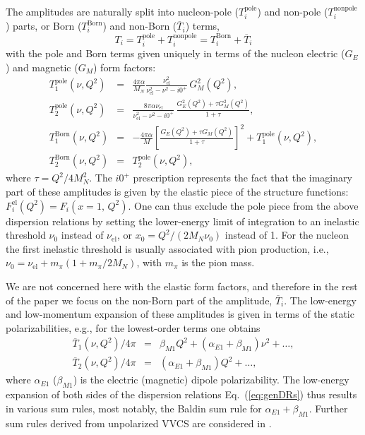 \documentclass[12pt,preprint,tightenlines,
showpacs,preprintnumbers,amsmath,amssymb,
a4paper,nofootinbib]{revtex4-1}
\def\beq{\begin{equation}}
\def\eeq{\end{equation}}
\def\bea{\begin{eqnarray}}
\def\eea{\end{eqnarray}}
\def\Eqref#1{Eq.~(\ref{eq:#1})}
\def\al{\alpha}
\def\nn{\nonumber}
\def\ol#1{\overline{#1}}
\begin{document}
The amplitudes are naturally split into nucleon-pole ($T_i^{\mathrm{pole}}$) and non-pole ($T_i^{\mathrm{nonpole}}$)
parts, or Born ($T_i^{\mathrm{Born}}$) and non-Born ($\ol T_i$) terms,
\beq
T_i = T_i^{\mathrm{pole}} + T_i^{\mathrm{nonpole}}
= T_i^{\mathrm{Born}} + \ol T_i
\eeq 
with the pole and Born terms given uniquely in terms
of the nucleon electric ($G_E$) and magnetic ($G_M$) form factors:
\begin{subequations}
\bea
T_1^{\mathrm{pole}}   (\nu,Q^2) &=& \frac{4\pi \al}{M_N}
\frac{\nu_\mathrm{el}^2}{\nu_\mathrm{el}^2-\nu^2-i0^+}\, G_M^2(Q^2), \\
 T_2^{\mathrm{pole}}(\nu,Q^2) &=& \frac{8\pi \al\nu_\mathrm{el}}{\nu_\mathrm{el}^2-\nu^2-i0^+}\, \frac{G_E^2(Q^2)+\tau G_M^2(Q^2)}{1+\tau}, \\
T_1^{\mathrm{Born}}(\nu, Q^2) &=& -\frac{4\pi \alpha}{M}\left[\frac{G_E(Q^2)+\tau G_M (Q^2)}{1+\tau}\right]^2+T_1^{\mathrm{pole}}(\nu, Q^2),\\ 
T_2^{\mathrm{Born}}(\nu, Q^2) &=& T_2^{\mathrm{pole}}(\nu, Q^2),
\eea
\end{subequations}
where $\tau = Q^2/4 M_N^2$. The $i0^+$ prescription represents the fact that the imaginary part of these amplitudes is given by
the elastic piece of the structure functions: $F_i^{\mathrm{el}}(Q^2) = F_i(x=1, \, Q^2)$. One can thus
exclude the pole piece from the above dispersion relations
by setting the lower-energy limit of integration to an inelastic threshold $\nu_0$ instead of $\nu_\mathrm{el}$, 
or $x_0 = Q^2/(2M_N\nu_0)$ instead of 1. 
For the nucleon the first inelastic
threshold is usually associated with pion production, i.e.,
$\nu_0 = \nu_\mathrm{el}+ m_\pi (1 + m_\pi/2M_N) $, with $m_\pi$ is the pion mass.

We are not concerned here with the elastic form factors, and therefore in the rest of the paper we focus on the non-Born part
of the amplitude,  $\ol T_i$. The low-energy and low-momentum expansion
of these amplitudes is given in terms of the static polarizabilities, e.g., for the lowest-order terms one obtains
\bea 
\ol T_1(\nu, Q^2)/4\pi  &=& \beta_{M1} Q^2 + (\alpha_{E1} + \beta_{M1}) \nu^2 + \ldots, \nn\\
\ol T_2(\nu, Q^2)/4\pi  &=&  (\alpha_{E1} + \beta_{M1}) Q^2 + \ldots,
\eea 
where $\alpha_{E1}$ ($\beta_{M1}$) is  the  electric (magnetic) dipole
polarizability.
The low-energy expansion of both sides of the dispersion relations \Eqref{genDRs} thus results in various sum rules, most notably, the Baldin sum rule \cite{Baldin:1960} for 
 $\alpha_{E1} + \beta_{M1}$. Further sum rules derived from unpolarized VVCS are considered in 
 \cite{Lensky:2017bwi}.
 
\end{document}
